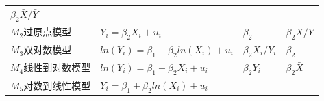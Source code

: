 \documentclass[12pt,(landscape,a4paper),(portrait,a4paper)]{article}
\begin{document}
\begin{longtable}[]{@{}llll@{}}
\begin{minipage}[t]{0.22\columnwidth}
\(\beta_2\bar{X}/\bar{Y}\)\strut
\end{minipage}\tabularnewline
\begin{minipage}[t]{0.18\columnwidth}\raggedright
\(M_2\)过原点模型\strut
\end{minipage} & \begin{minipage}[t]{0.31\columnwidth}\raggedright
\(Y_i=\beta_2X_i+u_i\)\strut
\end{minipage} & \begin{minipage}[t]{0.17\columnwidth}\raggedright
\(\beta_2\)\strut
\end{minipage} & \begin{minipage}[t]{0.22\columnwidth}\raggedright
\(\beta_2\bar{X}/\bar{Y}\)\strut
\end{minipage}\tabularnewline
\begin{minipage}[t]{0.18\columnwidth}\raggedright
\(M_3\)双对数模型\strut
\end{minipage} & \begin{minipage}[t]{0.31\columnwidth}\raggedright
\(ln(Y_i)=\beta_1+\beta_2ln(X_i)+u_i\)\strut
\end{minipage} & \begin{minipage}[t]{0.17\columnwidth}\raggedright
\(\beta_2X_i/Y_i\)\strut
\end{minipage} & \begin{minipage}[t]{0.22\columnwidth}\raggedright
\(\beta_2\)\strut
\end{minipage}\tabularnewline
\begin{minipage}[t]{0.18\columnwidth}\raggedright
\(M_4\)线性到对数模型\strut
\end{minipage} & \begin{minipage}[t]{0.31\columnwidth}\raggedright
\(ln(Y_i)=\beta_1+\beta_2X_i+u_i\)\strut
\end{minipage} & \begin{minipage}[t]{0.17\columnwidth}\raggedright
\(\beta_2Y_i\)\strut
\end{minipage} & \begin{minipage}[t]{0.22\columnwidth}\raggedright
\(\beta_2\bar{X}\)\strut
\end{minipage}\tabularnewline
\begin{minipage}[t]{0.18\columnwidth}\raggedright
\(M_5\)对数到线性模型\strut
\end{minipage} & \begin{minipage}[t]{0.31\columnwidth}\raggedright
\(Y_i=\beta_1+\beta_2ln(X_i)+u_i\)\strut
\end{minipage} & \begin{minipage}[t]{0.17\columnwidth}\raggedright

\end{minipage}
\end{longtable}
\end{document}
